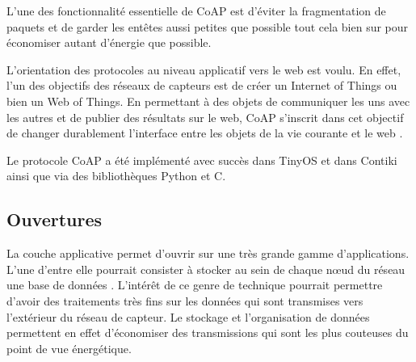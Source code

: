 L'une des fonctionnalité essentielle de CoAP est d'éviter la fragmentation de
paquets et de garder les entêtes aussi petites que possible tout cela bien sur
pour économiser autant d'énergie que possible.

L'orientation des protocoles au niveau applicatif vers le web est voulu. En
effet, l'un des objectifs des réseaux de capteurs est de créer un Internet of
Things ou bien un Web of Things. En permettant à des objets de communiquer les
uns avec les autres et de publier des résultats sur le web, CoAP s'inscrit dans
cet objectif de changer durablement l'interface entre les objets de la vie
courante et le web \cite{Glombitza:2009:IWS:1658192.1658197}.

Le protocole CoAP a été implémenté avec succès dans TinyOS \cite{coap-design}
et dans Contiki \cite{coap} ainsi que via des bibliothèques Python et C.

\subsection{Ouvertures}

La couche applicative permet d'ouvrir sur une très grande gamme d'applications.
L'une d'entre elle pourrait consister à stocker au sein de chaque nœud du
réseau une base de données \cite{tsiftes11database}. L'intérêt de ce genre de
technique pourrait permettre d'avoir des traitements très fins sur les données
qui sont transmises vers l'extérieur du réseau de capteur. Le stockage et
l'organisation de données permettent en effet d'économiser des transmissions
qui sont les plus couteuses du point de vue énergétique.
